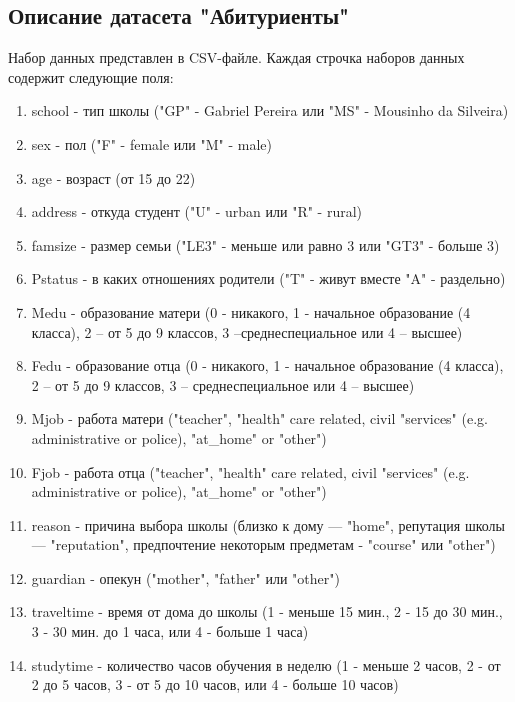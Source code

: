 \documentclass[a4paper]{article}
\begin{document}
\newpage
\begin{center}
    \hfill \break
    \section{Описание датасета "Абитуриенты"}
\end{center}
\normalsize{
    Набор данных представлен в CSV-файле. Каждая строчка наборов данных содержит следующие поля:
    \begin{enumerate} 
        \item school - тип школы ("GP" - Gabriel Pereira или "MS" - Mousinho da Silveira)
        \item sex - пол ("F" - female или "M" - male)
        \item age - возраст (от 15 до 22)
        \item address - откуда студент ("U" - urban или "R" - rural)
        \item famsize - размер семьи ("LE3" - меньше или равно 3 или "GT3" - больше 3)
        \item Pstatus - в каких отношениях родители ("T" - живут вместе "A" - раздельно)
        \item Medu - образование матери (0 - никакого, 1 - начальное образование (4 класса), 2 – от 5 до 9 классов, 3 –среднеспециальное или 4 – высшее)
        \item Fedu - образование отца (0 - никакого, 1 - начальное образование (4 класса), 2 – от 5 до 9 классов, 3 – среднеспециальное или 4 – высшее)
        \item Mjob - работа матери ("teacher", "health" care related, civil "services" (e.g. administrative or police), "at\_home" or "other")
        \item Fjob - работа отца ("teacher", "health" care related, civil "services" (e.g. administrative or police), "at\_home" or "other")
        \item reason - причина выбора школы (близко к дому — "home", репутация школы — "reputation", предпочтение некоторым предметам - "course" или "other")
        \item guardian - опекун ("mother", "father" или "other")
        \item traveltime - время от дома до школы (1 - меньше 15 мин., 2 - 15 до 30 мин., 3 - 30 мин. до 1 часа, или 4 - больше 1 часа)
        \item studytime - количество часов обучения в неделю (1 - меньше 2 часов, 2 - от 2 до 5 часов, 3 - от 5 до 10 часов, или 4 - больше 10 часов)

\end{enumerate}}
\end{document}
